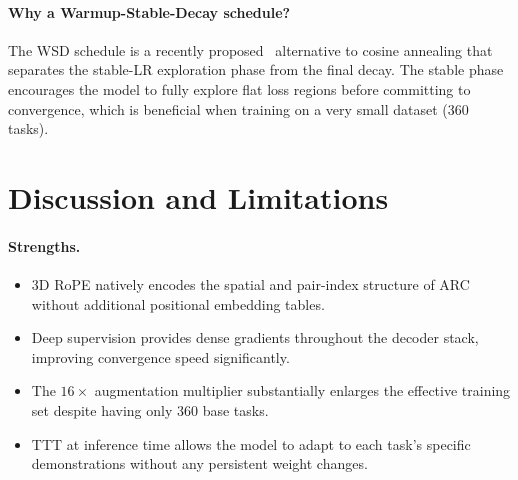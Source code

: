 \documentclass[11pt,a4paper]{article}
\begin{document}
\paragraph{Why a Warmup-Stable-Decay schedule?}
The WSD schedule is a recently proposed~\cite{hu2024minicpm} alternative to cosine
annealing that separates the stable-LR exploration phase from the final decay.  The
stable phase encourages the model to fully explore flat loss regions before committing
to convergence, which is beneficial when training on a very small dataset (360 tasks).

\section{Discussion and Limitations}
\label{sec:discussion}

\paragraph{Strengths.}
\begin{itemize}[noitemsep]
  \item 3D RoPE natively encodes the spatial and pair-index structure of ARC without
        additional positional embedding tables.
  \item Deep supervision provides dense gradients throughout the decoder stack,
        improving convergence speed significantly.
  \item The $16\times$ augmentation multiplier substantially enlarges the effective
        training set despite having only 360 base tasks.
  \item TTT at inference time allows the model to adapt to each task's specific
        demonstrations without any persistent weight changes.
\end{itemize}
\end{document}
